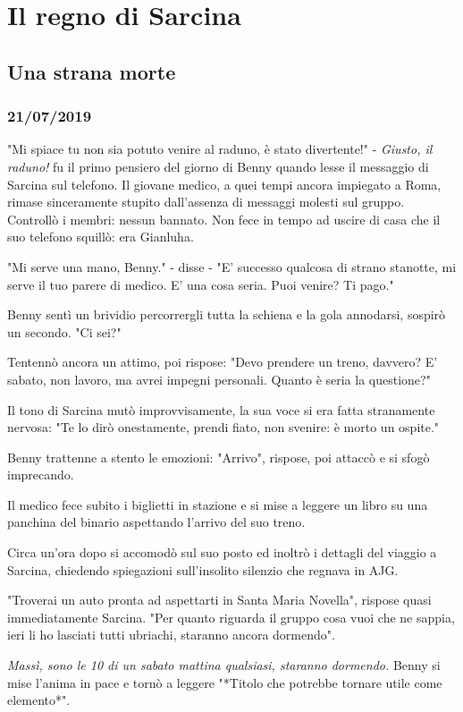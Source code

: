 \chapter{Il regno di Sarcina}
\section{Una strana morte}
\subsection*{21/07/2019}


"Mi spiace tu non sia potuto venire al raduno, è stato divertente!" - \textit{Giusto, il raduno!} fu il primo pensiero del giorno di Benny quando lesse il messaggio di Sarcina sul telefono. Il giovane medico, a quei tempi ancora impiegato a Roma, rimase sinceramente stupito dall'assenza di messaggi molesti sul gruppo. Controllò i membri: nessun bannato. Non fece in tempo ad uscire di casa che il suo telefono squillò: era Gianluha.

"Mi serve una mano, Benny." - disse - "E' successo qualcosa di strano stanotte, mi serve il tuo parere di medico. E' una cosa seria. Puoi venire? Ti pago."

Benny sentì un brividio percorrergli tutta la schiena e la gola annodarsi, sospirò un secondo.
"Ci sei?"

Tentennò ancora un attimo, poi rispose: "Devo prendere un treno, davvero? E' sabato, non lavoro, ma avrei impegni personali. Quanto è seria la questione?"

Il tono di Sarcina mutò improvvisamente, la sua voce si era fatta stranamente nervosa: "Te lo dirò onestamente, prendi fiato, non svenire: è morto un ospite."

Benny trattenne a stento le emozioni: "Arrivo", rispose, poi attaccò e si sfogò imprecando.

Il medico fece subito i biglietti in stazione e si mise a leggere un libro su una panchina del binario aspettando l'arrivo del suo treno.

Circa un'ora dopo si accomodò sul suo posto ed inoltrò i dettagli del viaggio a Sarcina, chiedendo spiegazioni sull'insolito silenzio che regnava in AJG.

"Troverai un auto pronta ad aspettarti in Santa Maria Novella", rispose quasi immediatamente Sarcina. "Per quanto riguarda il gruppo cosa vuoi che ne sappia, ieri li ho lasciati tutti ubriachi, staranno ancora dormendo".

\textit{Massì, sono le 10 di un sabato mattina qualsiasi, staranno dormendo.} Benny si mise l'anima in pace e tornò a leggere "*Titolo che potrebbe tornare utile come elemento*".

